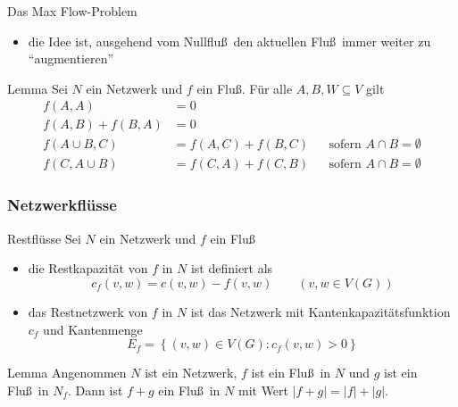 \documentclass[aspectratio=1610, 11pt]{beamer}
\newcommand\cbc[1]{\left\{{#1}\right\}}
\newcommand{\mytitle}{Netzwerkfl\"usse}
\begin{document}
\begin{frame}
\begin{overprint}
\begin{exampleblock}{Das Max Flow-Problem}
\begin{itemize}
				\item die Idee ist, ausgehend vom Nullflu\ss\ den aktuellen Flu\ss\ immer weiter zu ``augmentieren''
			\end{itemize}
		\end{exampleblock}
		\begin{block}{Lemma}
			Sei $N$ ein Netzwerk und $f$ ein Flu\ss.
			F\"ur alle $A,B,W\subseteq V$ gilt
			\begin{align*}
				f(A,A)&=0\\
				f(A,B)+f(B,A)&=0\\
				f(A\cup B,C)&=f(A,C)+f(B,C)&&\mbox{sofern }A\cap B=\emptyset\\
				f(C,A\cup B)&=f(C,A)+f(C,B)&&\mbox{sofern }A\cap B=\emptyset
			\end{align*}
		\end{block}
	\end{overprint}
\end{frame}

\begin{frame}\frametitle{\mytitle}
	\begin{overprint}
		\begin{exampleblock}{Restfl\"usse}
			Sei $N$ ein Netzwerk und $f$ ein Flu\ss
			\begin{itemize}
				\item die \alert{Restkapazit\"at} von $f$ in $N$ ist definiert als
					$$c_f(v,w)=c(v,w)-f(v,w)\qquad(v,w\in V(G))$$
				\item das \alert{Restnetzwerk} von $f$ in $N$ ist das Netzwerk mit Kantenkapazit\"atsfunktion $c_f$ und Kantenmenge
					$$E_f=\cbc{(v,w)\in V(G):c_f(v,w)>0}$$
			\end{itemize}
		\end{exampleblock}
		\begin{block}{Lemma}
			Angenommen $N$ ist ein Netzwerk, $f$ ist ein Flu\ss\ in $N$ und $g$ ist ein Flu\ss\ in $N_f$.
			Dann ist $f+g$ ein Flu\ss\ in $N$ mit Wert $|f+g|=|f|+|g|$.
		\end{block}
	\end{overprint}
\end{frame}
\end{document}
